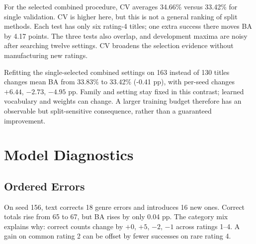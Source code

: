 \documentclass[11pt,letterpaper]{article}
\begin{document}
For the selected combined procedure, CV averages 34.66\% versus 33.42\% for single validation. CV is higher here, but this is not a general ranking of split methods. Each test has only six rating-4 titles; one extra success there moves BA by 4.17 points. The three tests also overlap, and development maxima are noisy after searching twelve settings. CV broadens the selection evidence without manufacturing new ratings.

Refitting the single-selected combined settings on 163 instead of 130 titles changes mean BA from 33.83\% to 33.42\% (-0.41 pp), with per-seed changes $+6.44$, $-2.73$, $-4.95$ pp. Family and setting stay fixed in this contrast; learned vocabulary and weights can change. A larger training budget therefore has an observable but split-sensitive consequence, rather than a guaranteed improvement.


\FloatBarrier
\section{Model Diagnostics}
\subsection{Ordered Errors}

On seed 156, text corrects 18 genre errors and introduces 16 new ones. Correct totals rise from 65 to 67, but BA rises by only 0.04 pp. The category mix explains why: correct counts change by $+0$, $+5$, $-2$, $-1$ across ratings 1--4. A gain on common rating 2 can be offset by fewer successes on rare rating 4.
\end{document}
